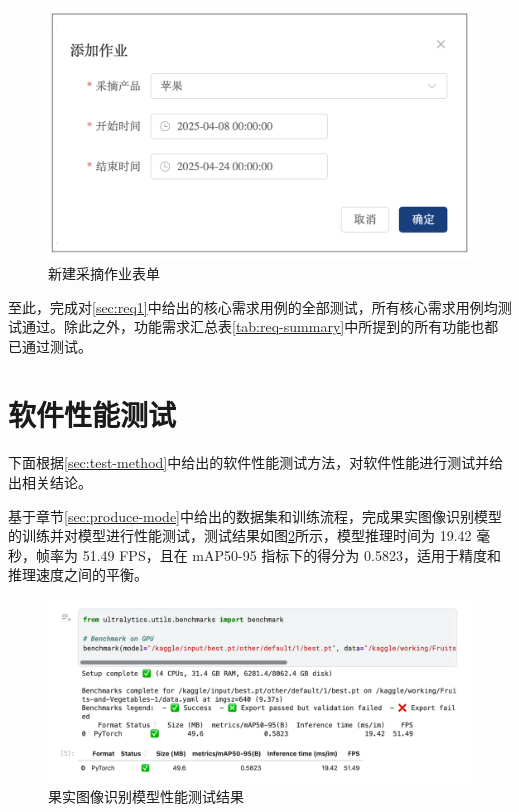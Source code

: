 \begin{figure}
    \centering
    \includegraphics[width=\linewidth]{../result/form-new-work.png}
    \caption{新建采摘作业表单}
    \label{fig:form-new-work}
\end{figure}

至此，完成对\ref{sec:req1}中给出的核心需求用例的全部测试，所有核心需求用例均测试通过。除此之外，功能需求汇总表\ref{tab:req-summary}中所提到的所有功能也都已通过测试。

\section{软件性能测试}\label{sec:test-perf}

下面根据\ref{sec:test-method}中给出的软件性能测试方法，对软件性能进行测试并给出相关结论。

基于章节\ref{sec:produce-mode}中给出的数据集和训练流程，完成果实图像识别模型的训练并对模型进行性能测试，测试结果如图\ref{fig:model-benchmark}所示，模型推理时间为 19.42 毫秒，帧率为 51.49 FPS，且在 mAP50-95 指标下的得分为 0.5823，适用于精度和推理速度之间的平衡。

\begin{figure}
    \centering
    \includegraphics[width=\linewidth]{../source/aws-img/yolov8/benchmark.png}
    \caption{果实图像识别模型性能测试结果}
    \label{fig:model-benchmark}
\end{figure}

